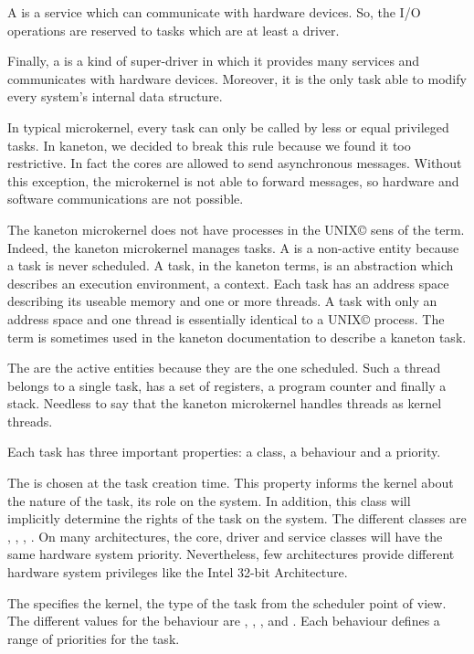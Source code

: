 \begin{multicols}{2}
A  is a service which can communicate with hardware devices.
So, the I/O operations are reserved to tasks which are at least a driver.

Finally, a  is a kind of super-driver in which it provides
many services and communicates with hardware devices. Moreover, it is
the only task able to modify every system's internal data structure.

In typical microkernel, every task can only be called by less or equal
privileged tasks. In kaneton, we decided to break this rule because we found
it too restrictive. In fact the cores are allowed to send asynchronous
messages. Without this exception, the microkernel is not able to forward
messages, so hardware and software communications are not possible.

The kaneton microkernel does not have processes in the
UNIX{\scriptsize \copyright} sens of the term. Indeed, the kaneton
microkernel manages tasks. A  is a non-active entity because
a task is never scheduled. A task, in the kaneton terms, is an abstraction
which describes an execution environment, a context. Each task has an
address space describing its useable memory and one or more threads.
A task with only an address space and one thread is essentially identical
to a UNIX{\scriptsize \copyright} process. The term  is
sometimes used in the kaneton documentation to describe a kaneton task.

The  are the active entities because they are the one
scheduled. Such a thread belongs to a single task, has a set of registers,
a program counter and finally a stack. Needless to say that the kaneton
microkernel handles threads as kernel threads.

Each task has three important properties: a class, a behaviour and a priority.

The  is chosen at the task creation time. This property
informs the kernel about the nature of the task, its role on the system.
In addition, this class will implicitly determine the rights of the task
on the system. The different classes are , ,
, . On many architectures, the core, driver
and service classes will have the same hardware system priority.
Nevertheless, few architectures provide different hardware system privileges
like the Intel 32-bit Architecture.

The  specifies the kernel, the type of the task from the
scheduler point of view. The different values for the behaviour are
, , , 
and . Each behaviour defines a range of priorities for the
task.


\end{multicols}

